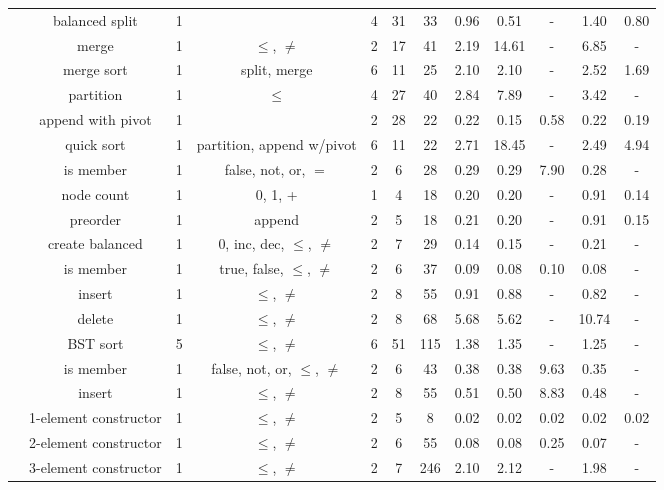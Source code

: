 \documentclass[10pt,preprint]{sigplanconf-pldi16}
\theoremstyle{definition}
\begin{document}
\begin{table*}[!htbp]
\begin{center}
{\begin{tabular}{@{} r|c| cccc | cccccc @{}}
 & balanced split & 1 &  & 4 & 31 & 33 & 0.96 & 0.51 & - & 1.40 & 0.80 \\
 & merge & 1 & $\leq$, $\neq$ & 2 & 17 & 41 & 2.19 & 14.61 & - & 6.85 & - \\
 & merge sort & 1 & split, merge & 6 & 11 & 25 & 2.10 & 2.10 & - & 2.52 & 1.69 \\
 & partition & 1 & $\leq$ & 4 & 27 & 40 & 2.84 & 7.89 & - & 3.42 & - \\
 & append with pivot & 1 &  & 2 & 28 & 22 & 0.22 & 0.15 & 0.58 & 0.22 & 0.19 \\
 & quick sort & 1 & partition, append w/pivot & 6 & 11 & 22 & 2.71 & 18.45 & - & 2.49 & 4.94 \\
\hline\multirow{4}{*}{\parbox{1cm}{\vspace{-0.85\baselineskip}}} & is member & 1 & false, not, or, $=$ & 2 & 6 & 28 & 0.29 & 0.29 & 7.90 & 0.28 & - \\
 & node count & 1 & 0, 1, + & 1 & 4 & 18 & 0.20 & 0.20 & - & 0.91 & 0.14 \\
 & preorder & 1 & append & 2 & 5 & 18 & 0.21 & 0.20 & - & 0.91 & 0.15 \\
 & create balanced & 1 & 0, inc, dec, $\leq$, $\neq$ & 2 & 7 & 29 & 0.14 & 0.15 & - & 0.21 & - \\
\hline\multirow{4}{*}{\parbox{1cm}{\vspace{-0.85\baselineskip}}} & is member & 1 & true, false, $\leq$, $\neq$ & 2 & 6 & 37 & 0.09 & 0.08 & 0.10 & 0.08 & - \\
 & insert & 1 & $\leq$, $\neq$ & 2 & 8 & 55 & 0.91 & 0.88 & - & 0.82 & - \\
 & delete & 1 & $\leq$, $\neq$ & 2 & 8 & 68 & 5.68 & 5.62 & - & 10.74 & - \\
 & BST sort & 5 & $\leq$, $\neq$ & 6 & 51 & 115 & 1.38 & 1.35 & - & 1.25 & - \\
\hline\multirow{5}{*}{\parbox{1cm}{\vspace{-0.85\baselineskip}}} & is member & 1 & false, not, or, $\leq$, $\neq$ & 2 & 6 & 43 & 0.38 & 0.38 & 9.63 & 0.35 & - \\
 & insert & 1 & $\leq$, $\neq$ & 2 & 8 & 55 & 0.51 & 0.50 & 8.83 & 0.48 & - \\
 & 1-element constructor & 1 & $\leq$, $\neq$ & 2 & 5 & 8 & 0.02 & 0.02 & 0.02 & 0.02 & 0.02 \\
 & 2-element constructor & 1 & $\leq$, $\neq$ & 2 & 6 & 55 & 0.08 & 0.08 & 0.25 & 0.07 & - \\
 & 3-element constructor & 1 & $\leq$, $\neq$ & 2 & 7 & 246 & 2.10 & 2.12 & - & 1.98 & - \\

\end{tabular}}
\end{center}
\end{table*}
\end{document}
